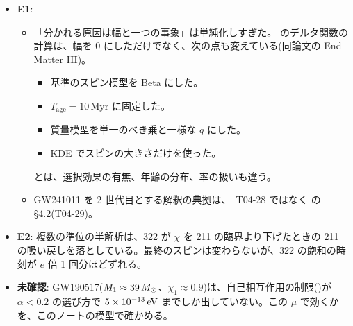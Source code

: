 \begin{itemize}
\begin{itemize}
  \item 孤立連星の年齢の「中央値 2.8 Gyr」は、形成の経路によらない GWTC-2 の値()。
  \item 「$\gtrsim6$ Gyr」は、すべての星団を 12 Gyr、$z<0.5$ とした場合( の Fig.~15)。
  \item ずれ機構で暗黒物質のすべてになる $f$ は、$\theta_i\sim1$ で $f\theta_i\approx(3$--$7)\times10^{14}\GeV$($3H=\mu$ と $H=\mu$ で振動が始まる場合。\texttt{e09.json})。E8 の $2\times10^{13}\GeV$ は、$\theta_i=\pi-10^{-6}$ まで調整した極端な値だった。$f=2\times10^{12}\GeV$、$\theta_i=1$ では暗黒物質の $\sim4\times10^{-5}$ になる。
  \end{itemize}
\item \textbf{E1}:
  \begin{itemize}
  \item 「分かれる原因は幅と一つの事象」は単純化しすぎた。 のデルタ関数の計算は、幅を 0 にしただけでなく、次の点も変えている(同論文の End Matter III)。
    \begin{itemize}
    \item 基準のスピン模型を Beta にした。
    \item $T_\mathrm{age}=10\,\mathrm{Myr}$ に固定した。
    \item 質量模型を単一のべき乗と一様な $q$ にした。
    \item KDE でスピンの大きさだけを使った。
    \end{itemize}
     とは、選択効果の有無、年齢の分布、率の扱いも違う。
  \item GW241011 を 2 世代目とする解釈の典拠は、\review\ T04-28 ではなく  の \S4.2(T04-29)。
  \end{itemize}
\item \textbf{E2}: 複数の準位の半解析は、322 が $\chi$ を 211 の臨界より下げたときの 211 の吸い戻しを落としている。最終のスピンは変わらないが、322 の飽和の時刻が $e$ 倍 1 回分ほどずれる。
\item \textbf{未確認}: GW190517($M_1\approx39\,M_\odot$、$\chi_1\approx0.9$)は、自己相互作用の制限()が $\alpha<0.2$ の選び方で $5\times10^{-13}\,\mathrm{eV}$ までしか出していない。この $\mu$ で効くかを、このノートの模型で確かめる。
\end{itemize}
